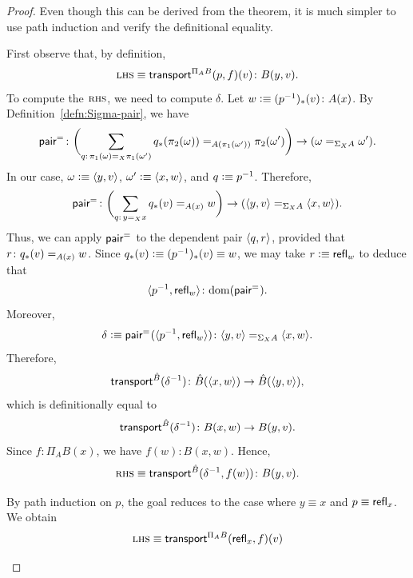 \begin{proof}
    Even though this can be derived from the theorem, it is much simpler to use path induction and verify the definitional equality.
    \begin{description}[font=\normalfont\scshape]
        \item[Type verification:]
        First observe that, by definition,
        \[
            \lhs\equiv\fun{transport}^{\Pi_AB}(p,f)(v)
                \colon B(y,v).
        \]
        To compute the $\textsc{rhs}$, we need to compute $\delta$. Let $w\defeq(p^{-1})_*(v)\colon A(x)$. By Definition~\ref{defn:Sigma-pair}, we have
        \[
            \fun{pair}^{\eq{}}\colon
                \biggl(
                \sum_{q\colon\pi_1(\omega)\eq X\pi_1(\omega')}
                q_*(\pi_2(\omega))\eq{A(\pi_1(\omega'))}\pi_2(\omega')
                \biggr)
                \to(\omega\eq{\Sigma_XA}\omega').
        \]
        In our case, $\omega\mathrel{\vcentcolon}\equiv\langle y,v\rangle$, $\omega'\mathrel{\vcentcolon}\equiv\langle x,w\rangle$, and $q\mathrel{\vcentcolon}\equiv p^{-1}$. Therefore,
        \[
            \fun{pair}^{\eq{}}\colon
                \biggl(
                \sum_{q\colon y\eq X x}
                q_*(v)\eq{A(x)}w
                \biggr)
                \to(\dep{y,v}\eq{\Sigma_XA}\dep{x,w}).
        \]
        Thus, we can apply $\mathsf{pair}^{\mathrel{=_{}}}$ to the dependent pair $\langle q,r\rangle$, provided that $r\colon q_*(v)\eq{A(x)}w$. Since $q_*(v)\mathrel{\vcentcolon}\equiv(p^{-1})_*(v)\equiv w$, we may take $r\mathrel{\vcentcolon}\equiv\mathsf{refl}_w$ to deduce that 
        \[
            \dep{p^{-1},\fun{refl}_w}
                \colon\dom(\fun{pair}^{\eq{}}).
        \]
        Moreover,
        \[
            \delta\defeq
                \fun{pair}^{\eq{}}(\dep{p^{-1},\fun{refl}_w})
                    \colon\dep{y,v}\eq{\Sigma_XA}\dep{x,w}.
        \]
        Therefore,
        \[
            \fun{transport}^{\hat B}(\delta^{-1})\colon
                \hat B(\dep{x,w})\to\hat B(\dep{y,v}),
        \]
        which is definitionally equal to
        \[
            \fun{transport}^{\hat B}(\delta^{-1})
                \colon B(x,w)\to B(y,v).
        \]
        Since $f\colon\Pi_AB(x)$, we have $f(w)\colon B(x,w)$. Hence,
        \[
            \rhs\equiv\fun{transport}^{\hat B}(\delta^{-1},f(w))
                \colon B(y,v).
        \]
        \item[Inhabitation:] By path induction on $p$, the goal reduces to the case where $y\equiv x$ and $p\equiv\mathsf{refl}_x$. We obtain
        \begin{align*}
            \lhs&\equiv
                \fun{transport}^{\Pi_AB}(\fun{refl}_x,f)(v)\\

\end{align*}
\end{description}
\end{proof}
